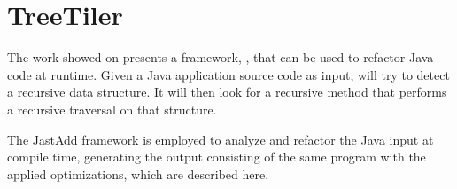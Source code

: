 \section{TreeTiler}
\label{sec:tiler}

The work showed on \cite{tree_tiler} presents a framework, \treetiler, that can be used to refactor Java code at runtime. Given a Java application source code as input, \treetiler will try to detect a recursive data structure. It will then look for a recursive method that performs a recursive traversal on that structure.

The JastAdd framework is employed to analyze and refactor the Java input at compile time, generating the output consisting of the same program with the applied optimizations, which are described here.


